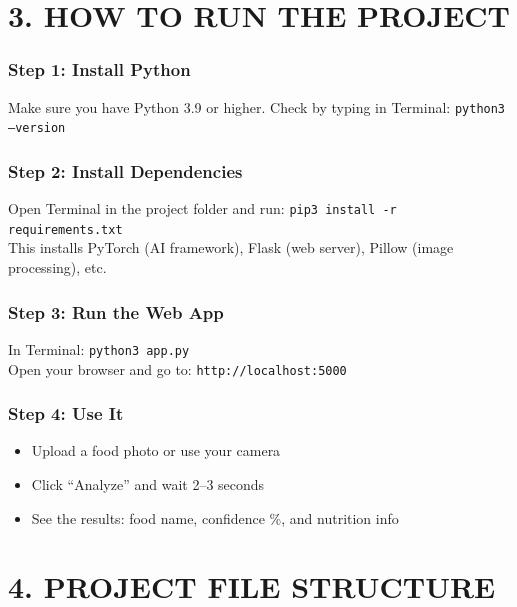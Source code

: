 \documentclass[11pt,a4paper]{article}
\begin{document}
\newpage
\section{3. HOW TO RUN THE PROJECT}

\subsubsection{Step 1: Install Python}
Make sure you have Python 3.9 or higher. Check by typing in Terminal: \texttt{python3 --version}

\subsubsection{Step 2: Install Dependencies}
Open Terminal in the project folder and run: \texttt{pip3 install -r requirements.txt}\\
This installs PyTorch (AI framework), Flask (web server), Pillow (image processing), etc.

\subsubsection{Step 3: Run the Web App}
In Terminal: \texttt{python3 app.py}\\
Open your browser and go to: \texttt{http://localhost:5000}

\subsubsection{Step 4: Use It}
\begin{itemize}
\item Upload a food photo or use your camera
\item Click ``Analyze'' and wait 2--3 seconds
\item See the results: food name, confidence \%, and nutrition info
\end{itemize}

\section{4. PROJECT FILE STRUCTURE}
\end{document}
